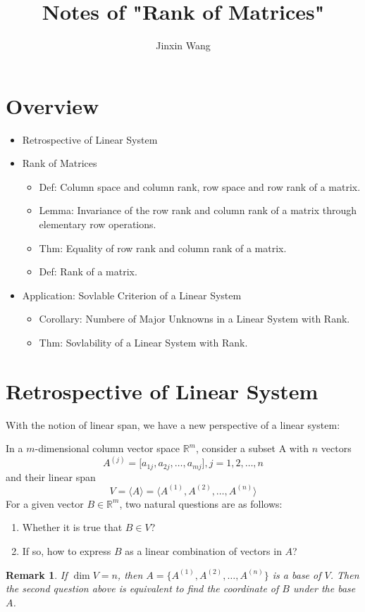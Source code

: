 \documentclass[onecolumn]{ctexart}
\title{Notes of "Rank of Matrices"}
\author{Jinxin Wang}
\date{}
\newtheorem{remark}{Remark}
\begin{document}
\maketitle

\section{Overview}
\begin{itemize}
  \item Retrospective of Linear System
  \item Rank of Matrices
  \begin{itemize}
    \item Def: Column space and column rank, row space and row rank of a 
    matrix.
    \item Lemma: Invariance of the row rank and column rank of a matrix through 
    elementary row operations.
    \item Thm: Equality of row rank and column rank of a matrix.
    \item Def: Rank of a matrix.
  \end{itemize}
  \item Application: Sovlable Criterion of a Linear System
  \begin{itemize}
    \item Corollary: Numbere of Major Unknowns in a Linear System with Rank.
    \item Thm: Sovlability of a Linear System with Rank.
  \end{itemize}
\end{itemize}

\section{Retrospective of Linear System}

With the notion of linear span, we have a new perspective of a linear system:

In a $m$-dimensional column vector space $\mathbb{R}^m$, consider a subset A with $n$ vectors
\[
  A^{(j)} = \lbrack a_{1j}, a_{2j}, \ldots, a_{mj} \rbrack , j = 1, 2, \ldots, n
\]
and their linear span
\[
  V = \langle A \rangle = \langle A^{(1)}, A^{(2)}, \ldots, A^{(n)} \rangle
\]
For a given vector $B \in \mathbb{R}^m$, two natural questions are as follows:
\begin{enumerate}
  \item Whether it is true that $B \in V$?
  \item If so, how to express $B$ as a linear combination of vectors in $A$?
\end{enumerate}
\begin{remark}
  If $\dim V = n$, then $A = \lbrace A^{(1)}, A^{(2)}, \ldots, A^{(n)} \rbrace$ 
  is a base of $V$. Then the second question above is equivalent to find the 
  coordinate of $B$ under the base $A$.
\end{remark}
\end{document}
